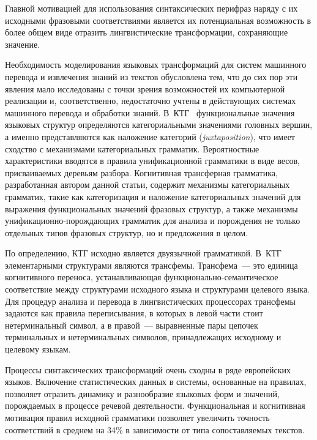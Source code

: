 \begin{multicols}{2}
Главной мотивацией для использования синтаксических перифраз наряду с 
их исходными фразовыми соответствиями является их потенциальная 
возможность в более общем виде отразить лингвистические трансформации, 
сохраняющие значение. 
  
  Необходимость моделирования языковых трансформаций для систем 
машинного перевода и извлечения знаний из текстов обусловлена тем, что до 
сих пор эти явления мало исследованы с точки зрения возможностей их 
компьютерной реализации и, соответственно, недостаточно учтены в 
действующих системах машинного перевода и обработки знаний. 
В~КТГ~\cite{1-koz} 
функциональные значения языковых структур определяются 
категориальными значениями головных вершин, а именно пред\-став\-ля\-ют\-ся 
как наложение категорий (\textit{juxtaposition}), что имеет сходство с 
механизмами категориальных грамматик. Вероятностные характеристики 
вводятся в правила унификационной грамматики в виде весов, 
присваиваемых деревьям разбора. Когнитивная трансферная грамматика, 
разработанная автором данной статьи, содержит механизмы категориальных 
грамматик, такие как категоризация и наложение категориальных значений 
для выражения функциональных значений фразовых структур, а также 
механизмы уни\-фи\-ка\-ци\-он\-но-по\-рож\-да\-ющих грамматик для анализа 
и порождения не только отдельных типов фразовых структур, но и 
предложения в целом. 
  
  По определению, КТГ исходно является двуязычной грамматикой. В~КТГ 
элементарными структурами являются трансфемы. Трансфема~--- это 
единица когнитивного переноса, устанавливающая 
  функ\-ци\-о\-наль\-но-се\-ман\-ти\-че\-ское соответствие между 
структурами исходного языка и структурами целевого языка. Для процедур 
анализа и перевода в лингвистических процессорах трансфемы задаются как 
правила переписывания, в которых в левой части стоит нетерминальный 
символ, а в правой~--- выравненные пары цепочек терминальных и 
нетерминальных символов, принадлежащих исходному и целевому языкам. 
  
  Процессы синтаксических трансформаций очень сходны в ряде 
европейских языков. Включение статистических данных в системы, 
основанные на правилах, позволяет отразить динамику и разнообразие 
языковых форм и значений, порождаемых в процессе речевой деятельности. 
Функциональная и когнитивная мотивация правил исходной грамматики 
позволяет увеличить точность соответствий в среднем на 34\% в зависимости 
от типа со\-по\-став\-ля\-емых текстов.
  

\end{multicols}
